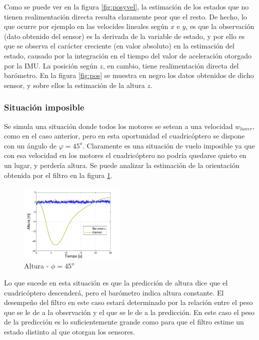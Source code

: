 \documentclass[main]{subfiles}
\begin{document}
Como se puede ver en la figura \ref{fig:posyvel}, la estimación de los estados que no tienen realimentación directa resulta claramente peor que el resto. De hecho, lo que ocurre por ejemplo en las velocides lineales según $x$ e $y$, es que la observación (dato obtenido del sensor) es la derivada de la variable de estado, y por ello es que se observa el carácter creciente (en valor absoluto) en la estimación del estado, causado por la integración en el tiempo del valor de aceleración otorgado por la IMU. La posición según $z$, en cambio, tiene realimentación directa del barómetro. En la figura \ref{fig:pos} se muestra en negro los datos obtenidos de dicho sensor, y sobre ellos la estimación de la altura $z$.

\subsubsection{Situación imposible}

Se simula una situación donde todos los motores se setean a una velocidad $w_{hover}$, como en el caso anterior, pero en esta oportunidad el cuadricóptero se dispone con un ángulo de $\varphi = 45^o$. Claramente es una situación de vuelo imposible ya que con esa velocidad en los motores el cuadricóptero no podría quedarse quieto en un lugar, y perdería altura. Se puede analizar la estimación de la orientación obtenida por el filtro en la figura \ref{fig:45}.

\begin{figure}
	\begin{center}	
	\vspace{-20pt}
	\includegraphics[width=0.45\textwidth]
		{./pics_kalman/altura_inclinado_45.pdf}
	\end{center}
	\caption{Altura - $\phi = 45^o$}
	\vspace{-20pt}
	\label{fig:45}
\end{figure}

Lo que sucede en esta situación es que la predicción de altura dice que el cuadricóptero descenderá, pero el barómetro indica altura constante. El desempeño del filtro en este caso estará determinado por la relación entre el peso que se le de a la observación y el que se le de a la predicción. En este caso el peso de la predicción es lo suficientemente grande como para que el filtro estime un estado distinto al que otorgan los sensores.
\end{document}
